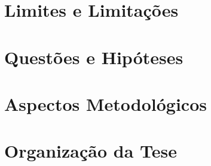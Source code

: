 \section{Limites e Limitações}
\label{sec:limites}


\section{Questões e Hipóteses}
\label{sec:questoes}


\section{Aspectos Metodológicos}
\label{sec:metodologia}


\section{Organização da Tese}
\label{sec:organizacao}
